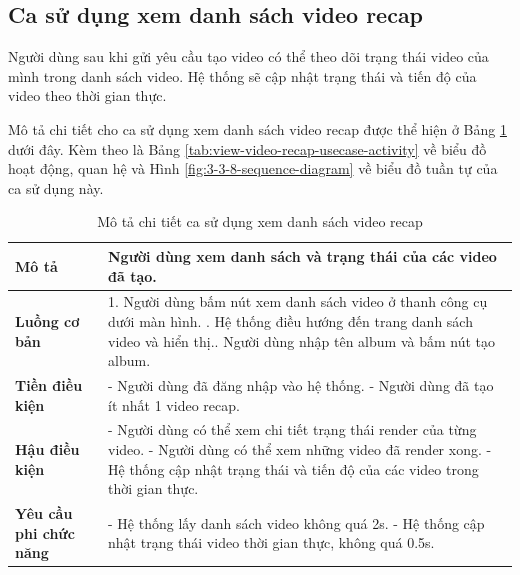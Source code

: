 \subsection{Ca sử dụng xem danh sách video recap}

Người dùng sau khi gửi yêu cầu tạo video có thể theo dõi trạng thái video của mình trong danh sách video. Hệ thống sẽ cập nhật trạng thái và tiến độ của video theo thời gian thực.  

Mô tả chi tiết cho ca sử dụng xem danh sách video recap được thể hiện ở Bảng \ref{tab:view-video-recap-usecase} dưới đây. Kèm theo là Bảng \ref{tab:view-video-recap-usecase-activity} về biểu đồ hoạt động, quan hệ và Hình \ref{fig:3-3-8-sequence-diagram} về biểu đồ tuần tự của ca sử dụng này. 

\noindent 

\begin{table}[H]
\centering
\caption{Mô tả chi tiết ca sử dụng xem danh sách video recap}
\label{tab:view-video-recap-usecase}
\begin{tabularx}{\linewidth}{| l | X |} 
\hline 
\textbf{Mô tả} & Người dùng xem danh sách và trạng thái của các video đã tạo. \\
\hline 
\textbf{Luồng cơ bản} & 1. Người dùng bấm nút xem danh sách video ở thanh công cụ dưới màn hình. \newline
                       2. Hệ thống điều hướng đến trang danh sách video và hiển thị.\newline
                       3. Người dùng nhập tên album và bấm nút tạo album. \\
\hline 
\textbf{Tiền điều kiện} & - Người dùng đã đăng nhập vào hệ thống. \newline
                            - Người dùng đã tạo ít nhất 1 video recap. \\
\textbf{Hậu điều kiện} & - Người dùng có thể xem chi tiết trạng thái render của từng video. \newline
                        - Người dùng có thể xem những video đã render xong. \newline
                        - Hệ thống cập nhật trạng thái và tiến độ của các video trong thời gian thực. \\
\hline 
\textbf{Yêu cầu phi chức năng} & - Hệ thống lấy danh sách video không quá 2s. \newline
                        - Hệ thống cập nhật trạng thái video thời gian thực, không quá 0.5s. \\   
\hline 
\end{tabularx}
\end{table}

